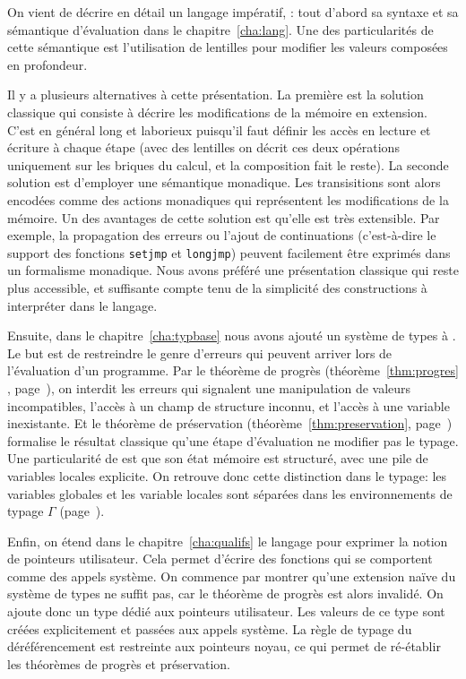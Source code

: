 On vient de décrire en détail un langage impératif, \langname: tout d'abord sa
syntaxe et sa sémantique d'évaluation dans le chapitre~\ref{cha:lang}. Une des
particularités de cette sémantique est l'utilisation de lentilles pour modifier
les valeurs composées en profondeur.

\label{page:ccl-II-monad}
Il y a plusieurs alternatives à cette présentation. La première est la solution
classique qui consiste à décrire les modifications de la mémoire en extension.
C'est en général long et laborieux puisqu'il faut définir les accès en lecture
et écriture à chaque étape (avec des lentilles on décrit ces deux opérations
uniquement sur les briques du calcul, et la composition fait le reste). La
seconde solution est d'employer une sémantique monadique. Les transisitions sont
alors encodées comme des actions monadiques qui représentent les modifications
de la mémoire. Un des avantages de cette solution est qu'elle est très
extensible. Par exemple, la propagation des erreurs ou l'ajout de continuations
(c'est-à-dire le support des fonctions \texttt{setjmp} et \texttt{longjmp})
peuvent facilement être exprimés dans un formalisme monadique. Nous avons
préféré une présentation classique qui reste plus accessible, et suffisante
compte tenu de la simplicité des constructions à interpréter dans le langage.

Ensuite, dans le chapitre~\ref{cha:typbase} nous avons ajouté un système de
types à \langname. Le but est de restreindre le genre d'erreurs qui peuvent
arriver lors de l'évaluation d'un programme. Par le théorème de progrès
(théorème~\ref{thm:progres} , page~\pageref{thm:progres}), on interdit les
erreurs qui signalent une manipulation de valeurs incompatibles, l'accès à un
champ de structure inconnu, et l'accès à une variable inexistante. Et le
théorème de préservation (théorème~\ref{thm:preservation},
page~\pageref{thm:preservation}) formalise le résultat classique qu'une étape
d'évaluation ne modifier pas le typage.
Une particularité de \langname est que son état mémoire est structuré, avec une
pile de variables locales explicite. On retrouve donc cette distinction dans le
typage: les variables globales et les variable locales sont séparées dans les
environnements de typage $Γ$ (page~\pageref{page:gamma-split}).

Enfin, on étend dans le chapitre~\ref{cha:qualifs} le langage pour exprimer la
notion de pointeurs utilisateur. Cela permet d'écrire des fonctions qui se
comportent comme des appels système. On commence par montrer qu'une extension
naïve du système de types ne suffit pas, car le théorème de progrès est alors
invalidé. On ajoute donc un type dédié aux pointeurs utilisateur. Les valeurs de
ce type sont créées explicitement et passées aux appels système. La règle de
typage du déréférencement est restreinte aux pointeurs noyau, ce qui permet de
ré-établir les théorèmes de progrès et préservation.


